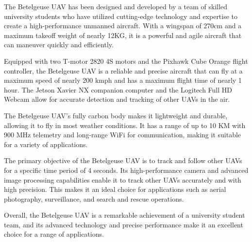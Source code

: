 \documentclass{article}
\begin{document}
The Betelgeuse UAV has been designed and developed by a team of skilled university students who have utilized cutting-edge technology and expertise to create a high-performance unmanned aircraft. With a wingspan of 270cm and a maximum takeoff weight of nearly 12KG, it is a powerful and agile aircraft that can maneuver quickly and efficiently.

Equipped with two T-motor 2820 4S motors and the Pixhawk Cube Orange flight controller, the Betelgeuse UAV is a reliable and precise aircraft that can fly at a maximum speed of nearly 200 kmph and has a maximum flight time of nearly 1 hour. The Jetson Xavier NX companion computer and the Logitech Full HD Webcam allow for accurate detection and tracking of other UAVs in the air.

The Betelgeuse UAV's fully carbon body makes it lightweight and durable, allowing it to fly in most weather conditions. It has a range of up to 10 KM with 900 MHz telemetry and long-range WiFi for communication, making it suitable for a variety of applications.

The primary objective of the Betelgeuse UAV is to track and follow other UAVs for a specific time period of 4 seconds. Its high-performance camera and advanced image processing capabilities enable it to track other UAVs accurately and with high precision. This makes it an ideal choice for applications such as aerial photography, surveillance, and search and rescue operations.

Overall, the Betelgeuse UAV is a remarkable achievement of a university student team, and its advanced technology and precise performance make it an excellent choice for a range of applications.
\end{document}
